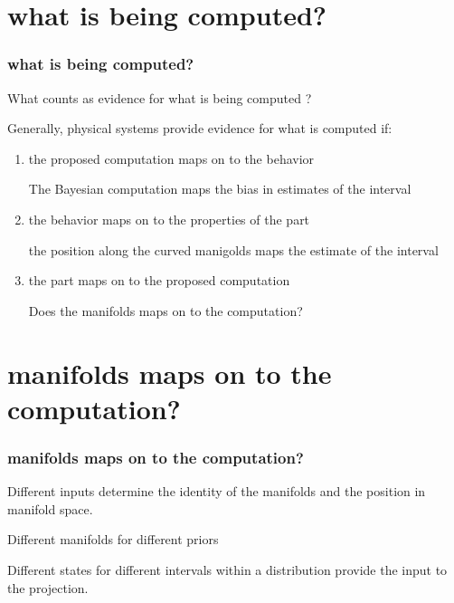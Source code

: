 \documentclass{beamer}
\begin{document}
\section{what is being computed?}
\begin{frame}
\frametitle{\textbf{what is being computed?} }
What counts as evidence for what is being computed ?

Generally, physical systems provide evidence for what is computed if:

\begin{enumerate}
    \item the proposed computation maps on to the behavior
    
    The Bayesian computation maps the bias in estimates of the interval

    \item the behavior maps on to the properties of the part
    
    the position along the curved manigolds maps the estimate of the interval

    \item the part maps on to the proposed computation
    
    Does the manifolds maps on to the computation?
\end{enumerate}

\end{frame}


\section{manifolds maps on to the computation?}
\begin{frame}
\frametitle{\textbf{manifolds maps on to the computation?} }
Different inputs determine the identity of the manifolds and the position in manifold space.


Different manifolds for different priors

Different states for different intervals within a distribution provide the input to the projection.

\end{frame}
\end{document}
